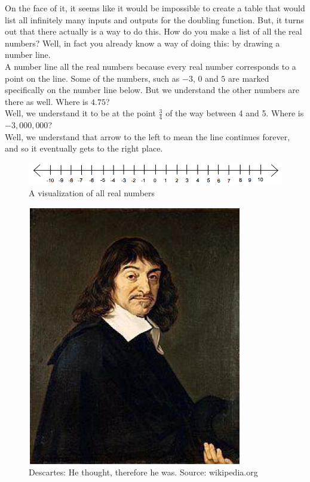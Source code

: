 On the face of it, it seems like it would be impossible to create a table that would list all infinitely many inputs and outputs for the doubling function. But, it turns out that there actually is a way to do this. How do you make a list of all the real numbers? Well, in fact you already know a way of doing this: by drawing a number line.\\

A number line  all the real numbers because every real number corresponds to a point on the line. Some of the numbers, such as $-3$, $0$ and $5$ are marked specifically on the number line below.  But we understand the other numbers are there as well. Where is $4.75$?\\

Well, we understand it to be at the point $\frac{3}{4}$ of the way between 4 and 5. Where is $-3,000,000$?\\

Well, we understand that arrow to the left to mean the line continues forever, and so it eventually gets to the right place.

\begin{figure}[H]
	\centering
	\includegraphics[width=\textwidth]{Sections/FunctionsandGraphsImages/Figure01.png}
	\caption{A visualization of all real numbers}
\end{figure}

\begin{figure}[H]
	\centering
	\includegraphics[scale=1.0]{Sections/FunctionsandGraphsImages/Figure02.png}
	\caption{Descartes: He thought, therefore he was. Source: wikipedia.org}
\end{figure}

